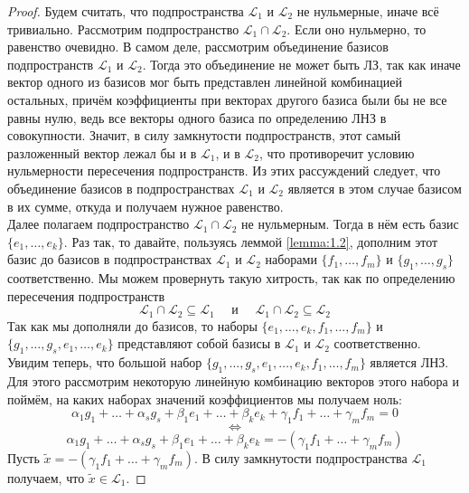 \documentclass[11pt]{article}
\begin{document}
\begin{proof}
    Будем считать, что подпространства $\mathcal{L}_1$ и $\mathcal{L}_2$ не нульмерные, иначе всё тривиально. Рассмотрим подпространство $\mathcal{L}_1 \cap \mathcal{L}_2$.
    Если оно нульмерно, то равенство очевидно. В самом деле, рассмотрим объединение базисов подпространств $\mathcal{L}_1$ и $\mathcal{L}_2$. Тогда это объединение не может быть ЛЗ, так как иначе 
    вектор одного из базисов мог быть представлен линейной комбинацией остальных, причём коэффициенты при векторах другого базиса были бы не все равны нулю, ведь все векторы одного базиса по определению ЛНЗ в совокупности. Значит, в силу замкнутости подпространств, 
    этот самый разложенный вектор лежал бы и в $\mathcal{L}_1$, и в $\mathcal{L}_2$, что противоречит условию нульмерности пересечения подпространств. Из этих рассуждений следует, что 
    объединение базисов в подпространствах $\mathcal{L}_1$ и $\mathcal{L}_2$ является в этом случае базисом в их сумме, откуда и получаем нужное равенство.
    \\
    Далее полагаем подпространство $\mathcal{L}_1 \cap \mathcal{L}_2$ не нульмерным. Тогда в нём есть базис 
    $\{e_1, \ldots, e_k\}$. Раз так, то давайте, пользуясь леммой \ref{lemma:1.2}, дополним этот базис до базисов в подпространствах $\mathcal{L}_1$ и $\mathcal{L}_2$ наборами 
    $\{f_1, \ldots, f_m\}$ и $\{g_1, \ldots, g_s\}$ соответственно. Мы можем провернуть такую хитрость, так как по определению пересечения подпространств
    \[\mathcal{L}_1 \cap \mathcal{L}_2 \subseteq \mathcal{L}_1 \quad \text{ и } \quad \mathcal{L}_1 \cap \mathcal{L}_2 \subseteq \mathcal{L}_2\]
    Так как мы дополняли до базисов, то наборы $\{e_1, \ldots, e_k, f_1, \ldots, f_m\}$ и $\{g_1, \ldots, g_s, e_1, \ldots, e_k\}$ представляют собой базисы в $\mathcal{L}_1$ и $\mathcal{L}_2$ соответственно.
    \\
    Увидим теперь, что большой набор $\{g_1, \ldots, g_s, e_1, \ldots, e_k, f_1, \ldots, f_m\}$ является ЛНЗ. Для этого рассмотрим некоторую линейную комбинацию векторов этого набора и поймём, на каких наборах значений коэффициентов мы получаем ноль:
    \[\alpha_1 g_1 + \ldots + \alpha_s g_s + \beta_1 e_1 + \ldots + \beta_k e_k + \gamma_1 f_1 + \ldots + \gamma_m f_m = 0\]
    \[\iff\]
    \[\alpha_1 g_1 + \ldots + \alpha_s g_s + \beta_1 e_1 + \ldots + \beta_k e_k = -\left(\gamma_1 f_1 + \ldots + \gamma_m f_m\right)\]
    Пусть $\widetilde{x} = -\left(\gamma_1 f_1 + \ldots + \gamma_m f_m\right)$. В силу замкнутости подпространства $\mathcal{L}_1$ получаем, что $\widetilde{x} \in \mathcal{L}_1$.

\end{proof}
\end{document}
